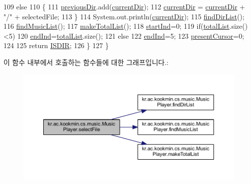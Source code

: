\begin{DoxyCode}
109       \textcolor{keywordflow}{else}
110       \{
111         \hyperlink{classkr_1_1ac_1_1kookmin_1_1cs_1_1music_1_1_music_player_a30e3d7b8c44924c865dc3dd52e206809}{previousDir}.add(\hyperlink{classkr_1_1ac_1_1kookmin_1_1cs_1_1music_1_1_music_player_a2614e5b1bf00c55b57e08354bcb6be19}{currentDir});
112         \hyperlink{classkr_1_1ac_1_1kookmin_1_1cs_1_1music_1_1_music_player_a2614e5b1bf00c55b57e08354bcb6be19}{currentDir} = \hyperlink{classkr_1_1ac_1_1kookmin_1_1cs_1_1music_1_1_music_player_a2614e5b1bf00c55b57e08354bcb6be19}{currentDir} + \textcolor{stringliteral}{"/"} + selectedFile;
113       \}
114       System.out.println(\hyperlink{classkr_1_1ac_1_1kookmin_1_1cs_1_1music_1_1_music_player_a2614e5b1bf00c55b57e08354bcb6be19}{currentDir});
115       \hyperlink{classkr_1_1ac_1_1kookmin_1_1cs_1_1music_1_1_music_player_a449b2c9816ef1a55f8113b7155000d97}{findDirList}();
116       \hyperlink{classkr_1_1ac_1_1kookmin_1_1cs_1_1music_1_1_music_player_a51155c43158965823b24d0f69987be47}{findMusicList}();
117       \hyperlink{classkr_1_1ac_1_1kookmin_1_1cs_1_1music_1_1_music_player_ae4d53ac419495684317e05ae42885e8a}{makeTotalList}();
118       \hyperlink{classkr_1_1ac_1_1kookmin_1_1cs_1_1music_1_1_music_player_af154b8f09fc298427ccfb1d0e7c94447}{startInd}=0;
119       \textcolor{keywordflow}{if}(\hyperlink{classkr_1_1ac_1_1kookmin_1_1cs_1_1music_1_1_music_player_ac7599b9b64999c9fcb1b7f1e6d32d188}{totalList}.size()<5)
120         \hyperlink{classkr_1_1ac_1_1kookmin_1_1cs_1_1music_1_1_music_player_ad162359e29d80d26914c27b6318901eb}{endInd}=\hyperlink{classkr_1_1ac_1_1kookmin_1_1cs_1_1music_1_1_music_player_ac7599b9b64999c9fcb1b7f1e6d32d188}{totalList}.size();
121       \textcolor{keywordflow}{else}
122         \hyperlink{classkr_1_1ac_1_1kookmin_1_1cs_1_1music_1_1_music_player_ad162359e29d80d26914c27b6318901eb}{endInd}=5;
123       \hyperlink{classkr_1_1ac_1_1kookmin_1_1cs_1_1music_1_1_music_player_aed823f56c3e5597d294d4f66a2d2fc54}{presentCursor}=0;
124 
125       \textcolor{keywordflow}{return} \hyperlink{classkr_1_1ac_1_1kookmin_1_1cs_1_1music_1_1_music_player_a56a46a09a7d67269c10a3f1284da0140}{ISDIR};
126     \}
127   \}
\end{DoxyCode}


이 함수 내부에서 호출하는 함수들에 대한 그래프입니다.\+:\nopagebreak
\begin{figure}[H]
\begin{center}
\leavevmode
\includegraphics[width=350pt]{classkr_1_1ac_1_1kookmin_1_1cs_1_1music_1_1_music_player_ad8a2c07b231ca2142a74cd0fd279a548_cgraph}
\end{center}
\end{figure}




